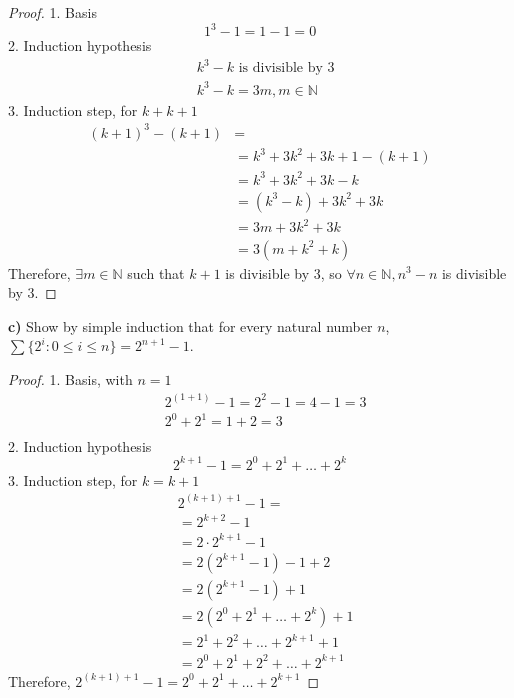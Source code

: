 \documentclass[titlepage, letterpaper, fleqn]{article}
\begin{document}
\begin{proof}
1. Basis \\
\[1^3 - 1 = 1 - 1 = 0 \tag*{n=1}\]
2. Induction hypothesis\\
\begin{align*}
& k^3 - k \text{ is divisible by 3} \tag{n=k} \\
& k^3 - k = 3m, m \in \mathbb{N}
\end{align*}
3. Induction step, for \(k + k+1\) \\
\begin{align*}
(k+1)^3 - (k+1) & = \\
& = k^3 + 3k^2 + 3k + 1 - (k + 1)\tag *{arithmetic} \\
& = k^3 + 3k^2 + 3k - k \tag*{ditto}\\
& = (k^3 - k) + 3k^2 + 3k \tag*{reordering}\\
& = 3m + 3k^2 + 3k \tag*{substitution by hypothesis}\\
& = 3(m + k^2 + k) \tag*{arithmetic}
\end{align*}
Therefore, \(\exists m \in \mathbb{N}\) such that \(k+1\) is divisible by 3, so \(\forall n \in \mathbb{N}, n^3 - n\) is divisible by 3.
\end{proof}

\pagebreak

{\large \textbf{c)} Show by simple induction that for every natural number \(n\), \(\sum \{2^i \colon 0 \leq i \leq n\} = 2^{n+1} - 1\).}

\begin{proof}
1. Basis, with \(n = 1\) \\
\begin{align*}
& 2^{(1 + 1)} - 1 = 2^2 -1 = 4 - 1 = 3 \tag*{RHS}\\
& 2^0 + 2^1 = 1 + 2 = 3 \tag*{LHS}\\
\end{align*}
2. Induction hypothesis\\
\[2^{k+1}-1 = 2^0 + 2^1 + \dots + 2^k \tag*{n=k}\]
3. Induction step, for \(k = k + 1\)\\
\begin{align*}
& 2^{(k+1)+1} -1 =\\
& = 2^{k+2} - 1\\
& = 2 \cdot 2^{k+1} -1\\
& = 2(2^{k+1} - 1) -1 + 2\tag*{modifications to match hypothesis}\\ 
& = 2(2^{k+1} - 1) + 1 \tag*{arithmetic}\\
& = 2(2^0 + 2^1 + \dots + 2^k) + 1 \tag*{substitution by hypothesis}\\
& = 2^1 + 2^2 + \dots + 2^{k+1} + 1 \tag*{ditto}\\
& = 2^0 + 2^1 + 2^2 + \dots + 2^{k+1} \tag*{substitute 1 by \(2^0\)}
\end{align*}
Therefore, \(2^{(k+1)+1} -1 = 2^0 + 2^1 + \dots + 2^{k+1}\)
\end{proof}
\end{document}
